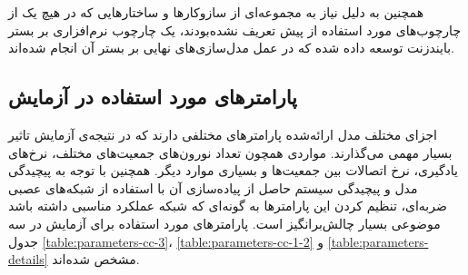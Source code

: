 \documentclass[12pt]{report}
\begin{document}
	همچنین به دلیل نیاز به مجموعه‌ای از سازوکار‌ها و ساختارهایی که در هیچ یک از چارچوب‌های مورد‌ استفاده از پیش تعریف نشده‌بودند، یک چارچوب نرم‌افزاری بر بستر بایندزنت توسعه داده شده‌ که در عمل مدل‌سازی‌های نهایی بر بستر آن انجام شده‌اند.
	
	\subsection{پارامتر‌های مورد استفاده در آزمایش}
	اجزای مختلف مدل ارائه‌شده پارامتر‌های مختلفی دارند که در نتیجه‌ی آزمایش تاثیر بسیار مهمی می‌گذارند. مواردی همچون تعداد نورون‌های جمعیت‌های مختلف، نرخ‌های یادگیری، نرخ اتصالات بین جمعیت‌ها و بسیاری موارد دیگر. همچنین با توجه به پیچیدگی مدل و پیچیدگی سیستم حاصل از پیاده‌سازی آن با استفاده از شبکه‌های عصبی ضربه‌ای، تنظیم کردن این پارامتر‌ها به گونه‌ای که شبکه عملکرد مناسبی داشته باشد موضوعی بسیار چالش‌برانگیز است. پارامتر‌های مورد استفاده برای آزمایش در سه جدول \ref{table:parameters-cc-3}، \ref{table:parameters-cc-1-2} و \ref{table:parameters-details} مشخص شده‌اند.
\end{document}
